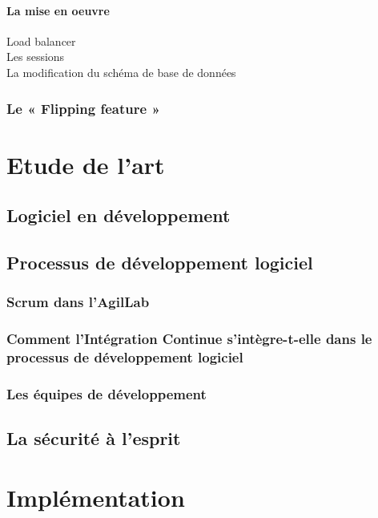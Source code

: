 \documentclass{report}
\begin{document}
          \subsubsection{La mise en oeuvre}
          Load balancer\\

          Les sessions\\

          La modification du schéma de base de données\\

        \subsection{Le « Flipping feature »}

    \chapter{Etude de l'art}

      \section{Logiciel en développement}

      \section{Processus de développement logiciel}

        \subsection{Scrum dans l'AgilLab}

        \subsection{Comment l’Intégration Continue s’intègre-t-elle dans le processus de développement logiciel}

        \subsection{Les équipes de développement}

      \section{La sécurité à l'esprit}

    \chapter{Implémentation}
\end{document}
